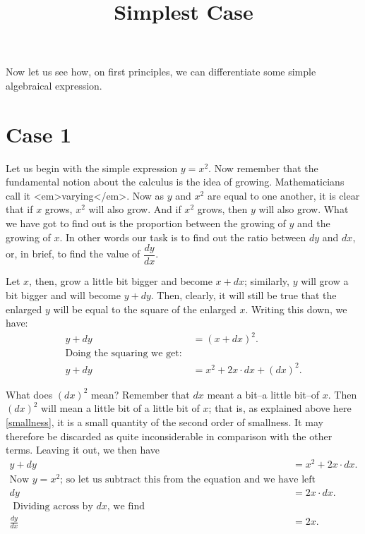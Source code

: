 \documentclass{ximera}
\title{Simplest Case}
\begin{document}
\begin{abstract}
\end{abstract}
\maketitle

Now let us see how, on first principles, we can differentiate some simple algebraical expression.

\section*{Case 1}
Let us begin with the simple expression $y=x^2$. Now remember that the fundamental notion about the calculus is the idea of growing. Mathematicians call it <em>varying</em>. Now as $y$ and $x^2$ are equal to one another, it is clear that if $x$ grows, $x^2$ will also grow. And if $x^2$ grows, then $y$ will also grow. What we have got to find out is the proportion between the growing of $y$ and the growing of $x$. In other words our task is to find out the ratio between $dy$ and $dx$, or, in brief, to find the value of $\dfrac{dy}{dx}$.

Let $x$, then, grow a little bit bigger and become $x + dx$; similarly, $y$ will grow a bit bigger and will become $y + dy$. Then, clearly, it will still be true that the enlarged $y$ will be equal to the square of the enlarged $x$. Writing this down, we have:
\begin{align*}
y + dy &= (x + dx)^2.\\
\text{Doing the squaring we get:}\;\\
y + dy &= x^2 + 2x · dx+(dx)^2.
\end{align*}

What does $(dx)^2$ mean? Remember that $dx$ meant a bit–a little bit–of $x$. Then $(dx)^2$ will mean a little bit of a little bit of $x$; that is, as explained above here \ref{smallness}, it is a small quantity of the second order of smallness. It may therefore be discarded as quite inconsiderable in comparison with the other terms. Leaving it out, we then have
\begin{align*} \label{diffexample}
y + dy &= x^2 + 2x · dx.  \\
\text{Now $y=x^2$; so let us subtract this from the equation
and we have left}\;\\
dy &= 2x · dx.  \\
\text{  Dividing across by $dx$, we find}\;\\
\frac{dy}{dx} &= 2x.
\end{align*}
\end{document}
